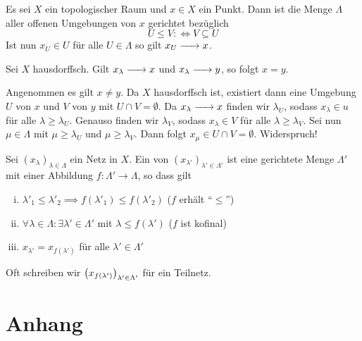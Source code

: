 Es sei $X$ ein topologischer Raum und $x \in X$ ein Punkt.
Dann ist die Menge $\Lambda$ aller offenen Umgebungen von $x$ gerichtet bezüglich
\[
	U \le V :\Longleftrightarrow V \subseteq U
\]
Ist nun $x_U \in U$ für alle $U \in \Lambda $ so gilt $x_U \grenzw{} x$.

\begin{lemma}[{name=[Eindeutigkeit von Grenzwerten]}]
	Sei $X$ hausdorffsch. Gilt $x_\lambda \grenzw{} x$ und $x_\lambda \grenzw{} y$, so folgt $x=y$.
\end{lemma}
\begin{beweis}
	Angenommen es gilt $x \neq y$. 
	Da $X$ hausdorffsch ist, existiert dann eine Umgebung $U$ von $x$ und $V$ von $y$ mit $U \cap V = \emptyset$. 
	Da $x_\lambda \grenzw{} x$ finden wir $\lambda_U$, sodass $x_\lambda \in u$ für alle $\lambda \ge \lambda_U$.
	Genauso finden wir $\lambda_V$, sodass $x_\lambda \in V$ für alle $\lambda \ge \lambda_V$.
	Sei nun $\mu \in \Lambda$ mit $\mu \ge \lambda_U$ und $\mu \ge \lambda_V$. 
	Dann folgt $x_\mu \in U\cap V = \emptyset$. Widerspruch!
\end{beweis}

\begin{definition}[{name=[Teilnetz]}]
	Sei $(x_\lambda)_{\lambda  \in \Lambda}$ ein Netz in $X$.
	Ein  von $(x_{\lambda'} )_{\lambda'  \in \Lambda'}$ ist eine gerichtete Menge $\Lambda'$ mit einer
	Abbildung $f \colon \Lambda' \to \Lambda$, so dass gilt
	\begin{enumerate}[i)]
		\item $\lambda'_1 \le \lambda'_2 \implies f(\lambda'_1) \le f(\lambda'_2)$ \hfill ($f$ erhält \enquote{$\le$})
		\item $\forall \lambda \in \Lambda : \exists \lambda' \in \Lambda'$ mit $\lambda  \le f(\lambda' )$ \hfill ($f$ ist kofinal)
		\item $x_{\lambda'} = x_{f(\lambda')}$ für alle $\lambda ' \in \Lambda'$
	\end{enumerate}
	Oft schreiben wir $\enbrace*{x_{f(\lambda')}}_{\lambda' \in \Lambda'}$ für ein Teilnetz.
\end{definition}







\cleardoubleoddemptypage
{}
\setcounter{page}{1}
\cleardoubleoddemptypage
\appendix

\section{Anhang} %
\label{sec:anhang}
% 
\printindex
\printbibliography
\listoffigures

